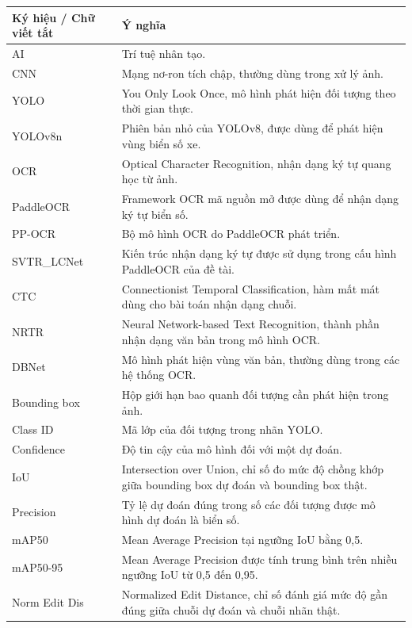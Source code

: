 \documentclass[13pt,a4paper]{report}
\begin{document}
\begin{table}[H]
	\centering
	\renewcommand{\arraystretch}{1.4}
	\begin{tabular}{|p{3.5cm}|p{10cm}|}
		\hline
		\textbf{Ký hiệu / Chữ viết tắt} & \textbf{Ý nghĩa} \\
		\hline
		AI & Trí tuệ nhân tạo. \\
		\hline
		CNN & Mạng nơ-ron tích chập, thường dùng trong xử lý ảnh. \\
		\hline
		YOLO & You Only Look Once, mô hình phát hiện đối tượng theo thời gian thực. \\
		\hline
		YOLOv8n & Phiên bản nhỏ của YOLOv8, được dùng để phát hiện vùng biển số xe. \\
		\hline
		OCR & Optical Character Recognition, nhận dạng ký tự quang học từ ảnh. \\
		\hline
		PaddleOCR & Framework OCR mã nguồn mở được dùng để nhận dạng ký tự biển số. \\
		\hline
		PP-OCR & Bộ mô hình OCR do PaddleOCR phát triển. \\
		\hline
		SVTR\_LCNet & Kiến trúc nhận dạng ký tự được sử dụng trong cấu hình PaddleOCR của đề tài. \\
		\hline
		CTC & Connectionist Temporal Classification, hàm mất mát dùng cho bài toán nhận dạng chuỗi. \\
		\hline
		NRTR & Neural Network-based Text Recognition, thành phần nhận dạng văn bản trong mô hình OCR. \\
		\hline
		DBNet & Mô hình phát hiện vùng văn bản, thường dùng trong các hệ thống OCR. \\
		\hline
		Bounding box & Hộp giới hạn bao quanh đối tượng cần phát hiện trong ảnh. \\
		\hline
		Class ID & Mã lớp của đối tượng trong nhãn YOLO. \\
		\hline
		Confidence & Độ tin cậy của mô hình đối với một dự đoán. \\
		\hline
		IoU & Intersection over Union, chỉ số đo mức độ chồng khớp giữa bounding box dự đoán và bounding box thật. \\
		\hline
		Precision & Tỷ lệ dự đoán đúng trong số các đối tượng được mô hình dự đoán là biển số. \\
		\hline
		mAP50 & Mean Average Precision tại ngưỡng IoU bằng 0,5. \\
		\hline
		mAP50-95 & Mean Average Precision được tính trung bình trên nhiều ngưỡng IoU từ 0,5 đến 0,95. \\
		\hline
		Norm Edit Dis & Normalized Edit Distance, chỉ số đánh giá mức độ gần đúng giữa chuỗi dự đoán và chuỗi nhãn thật. \\

\end{tabular}
\end{table}
\end{document}
